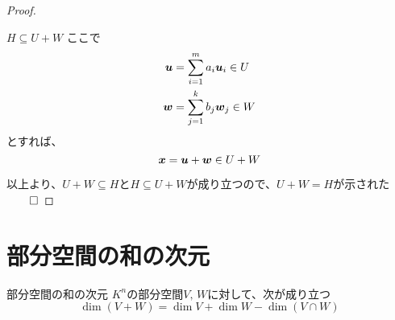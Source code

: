 \documentclass[../../../topic_linear-algebra]{subfiles}
\begin{document}
\begin{proof}
\begin{subpattern}{$H \subseteq U + W$}
    ここで
    \begin{align*}
      \vb*{u} & = \sum_{i=1}^m a_i \vb*{u}_i \in U \\
      \vb*{w} & = \sum_{j=1}^k b_j \vb*{w}_j \in W
    \end{align*}
    とすれば、
    \begin{equation*}
      \vb*{x} = \vb*{u} + \vb*{w} \in U + W
    \end{equation*}
  \end{subpattern}

  \br

  以上より、$U+W \subseteq H$と$H \subseteq U + W$が成り立つので、$U + W = H$が示された $\qed$
\end{proof}

\sectionline
\section{部分空間の和の次元}

\begin{theorem}{部分空間の和の次元}
  $K^n$の部分空間$V, \, W$に対して、次が成り立つ
  \begin{equation*}
    \dim(V + W) = \dim V + \dim W - \dim(V \cap W)
  \end{equation*}
\end{theorem}
\end{document}

